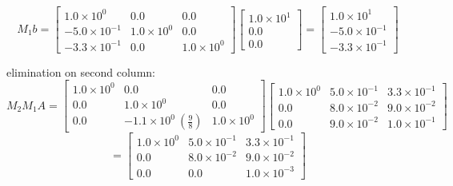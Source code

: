 \documentclass[11pt,twoside]{article}
\begin{document}
\begin{enumerate}
\begin{enumerate}
				 \[ M_1 b = 
				\left. \begin{bmatrix}
				1.0\times 10^0         & 0.0 & 0.0 \\
				-5.0 \times 10^{-1} & 1.0\times 10^0  &0.0\\
				-3.3 \times 10^{-1}  & 0.0 & 1.0\times 10^0  \end{bmatrix}
				 \right. 
				 \left. \begin{bmatrix} 
				1.0 \times 10^1  \\
				0.0   \\
				0.0  \end{bmatrix} \right. = 
				 \left. \begin{bmatrix} 
				1.0 \times 10^1  \\
				-5.0 \times 10^{-1}  \\
				-3.3 \times 10^{-1} \end{bmatrix} \right. \] 
				
				 elimination on second column:
				\[ M_2M_1 A = 
				\left. \begin{bmatrix}
				1.0\times 10^0         & 0.0 & 0.0 \\
				0.0 & 1.0\times 10^0  &0.0\\
				0.0& -1.1 \times 10^0  \ (\frac{9}{8})& 1.0\times 10^0  \end{bmatrix}
				 \right. 
				\left. \begin{bmatrix}
				1.0\times 10^0 & 5.0 \times 10^{-1} & 3.3 \times 10^{-1}\\
				0.0 & 8.0 \times 10^{-2} & 9.0 \times 10^{-2} \\
				0.0  & 9.0 \times 10^{-2}  & 1.0 \times 10^{-1} \end{bmatrix}
				 \right. \]
				 \[ = 
				 \left. \begin{bmatrix}
				1.0\times 10^0 & 5.0 \times 10^{-1} & 3.3 \times 10^{-1}\\
				0.0                & 8.0 \times 10^{-2} & 9.0 \times 10^{-2} \\
				0.0                & 0.0  & 1.0 \times 10^{-3} \end{bmatrix}
				 \right. \]
				 

\end{enumerate}
\end{enumerate}
\end{document}
